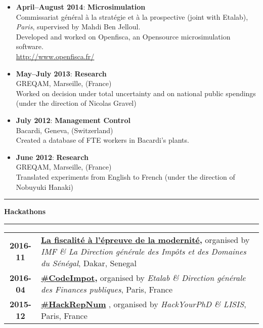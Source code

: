 \documentclass[a4paper,11pt]{article} %
\newcommand\espace{\vrule height 20pt width 0pt}
\newcommand{\titre}[1]{%
	\begin{center}
	\rule{\textwidth}{1pt}
	\par\vspace{0.1cm}
        \textbf{\large #1}
	\par\rule{\textwidth}{1pt}
	\end{center}
	}
\begin{document}
\begin{itemize}

\item \textbf{April--August 2014}:   \textbf{Microsimulation}\\
Commissariat général à la stratégie et à la prospective (joint with Etalab), \emph{Paris}, supervised by Mahdi Ben Jelloul.\\
Developed and worked on Openfisca, an Opensource microsimulation software.\\
\url{http://www.openfisca.fr/}

\item \textbf{May--July 2013}: \textbf{Research}\\
GREQAM, Marseille, (France)\\
 Worked on decision under total uncertainty and on national public spendings (under the direction of Nicolas Gravel)
 
 \item \textbf{July 2012}: \textbf{Management Control}\\
Bacardi, Geneva, (Switzerland)\\
Created a database of FTE workers in Bacardi's plants. 

 \item \textbf{June 2012}: \textbf{Research}\\
GREQAM, Marseille, (France)\\
 Translated experiments from English to French (under the direction of Nobuyuki Hanaki)


 
\end{itemize}
\titre{Hackathons}

\begin{tabular}{c@{ :  }p{}}
\espace



\textbf{2016-11} & \textbf{
\href{https://www.etalab.gouv.fr/openfisca-au-hackathon-sur-la-fiscalite-de-dakar}{La fiscalité à l'épreuve de la modernité},} organised by \emph{IMF \& La Direction générale des Impôts et des Domaines du Sénégal}, Dakar, Senegal \\
\textbf{2016-04} & \textbf{
\href{https://www.etalab.gouv.fr/codeimpot-un-hackathon-autour-de-louverture-du-code-source-du-calculateur-impots}{ \#CodeImpot},} organised by \emph{Etalab \& Direction générale des Finances publiques}, Paris, France \\
\textbf{2015-12} & \textbf{ 
\href{https://www.data.gouv.fr/en/reuses/hackrepnum-un-hackathon-recherche-autour-de-la-loi-sur-le-numerique/}
{\#HackRepNum}} , organised by \emph{HackYourPhD \& LISIS}, Paris, France \\


\end{tabular}
\newpage
\end{document}
